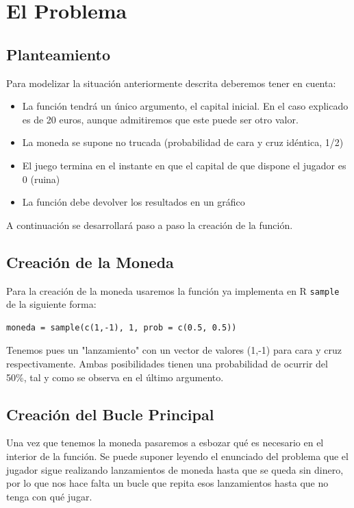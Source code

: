 \documentclass[10pt,a4paper]{article}
\begin{document}
\section{El Problema}
\subsection{Planteamiento}
Para modelizar la situación anteriormente descrita deberemos tener en cuenta:

\begin{itemize}
\item La función tendrá un único argumento, el capital inicial. En el caso explicado es de 20 euros, aunque admitiremos que este puede ser otro valor.
\item La moneda se supone no trucada (probabilidad de cara y cruz idéntica, 1/2)
\item El juego termina en el instante en que el capital de que dispone el jugador es 0 (ruina)
\item La función debe devolver los resultados en un gráfico
\end{itemize}

A continuación se desarrollará paso a paso la creación de la función.

\subsection{Creación de la Moneda}
Para la creación de la moneda usaremos la función ya implementa en R {\tt sample} de la siguiente forma:

\begin{verbatim}
moneda = sample(c(1,-1), 1, prob = c(0.5, 0.5))
\end{verbatim}

Tenemos pues un "lanzamiento" con un vector de valores (1,-1) para cara y cruz respectivamente. Ambas posibilidades tienen una probabilidad de ocurrir del 50\%, tal y como se observa en el último argumento.

\subsection{Creación del Bucle Principal}
Una vez que tenemos la moneda pasaremos a esbozar qué es necesario en el interior de la función. Se puede suponer leyendo el enunciado del problema que el jugador sigue realizando lanzamientos de moneda hasta que se queda sin dinero, por lo que nos hace falta un bucle que repita esos lanzamientos hasta que no tenga con qué jugar.
\end{document}
